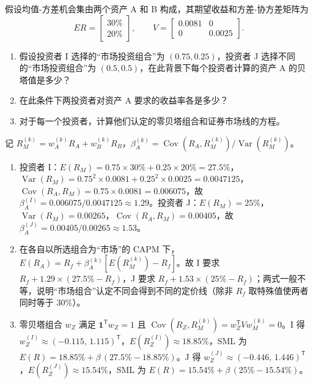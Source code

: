 \begin{problem}
 假设均值-方差机会集由两个资产 A 和 B 构成，其期望收益和方差-协方差矩阵为
\[
    ER=\begin{bmatrix}30\%\\20\%\end{bmatrix},\qquad
    V=\begin{bmatrix}0.0081&0\\0&0.0025\end{bmatrix}.
\]
\begin{enumerate}[label=(\alph*)]
    \item 假设投资者 I 选择的“市场投资组合”为 $(0.75,0.25)$，投资者 J 选择不同的“市场投资组合”为 $(0.5,0.5)$，在此背景下每个投资者计算的资产 A 的贝塔值是多少？
    \item 在此条件下两投资者对资产 A 要求的收益率各是多少？
    \item 对于每一个投资者，计算他们认定的零贝塔组合和证券市场线的方程。
\end{enumerate}
\end{problem}
\begin{solution}
记 $R_M^{(k)}=w_A^{(k)}R_A+w_B^{(k)}R_B$，$\beta_A^{(k)}=\operatorname{Cov}(R_A,R_M^{(k)})/\operatorname{Var}(R_M^{(k)})$。
\begin{enumerate}[label=(\alph*)]
\item 投资者 I：$E(R_M)=0.75\times30\%+0.25\times20\%=27.5\%$，$\operatorname{Var}(R_M)=0.75^2\times0.0081+0.25^2\times0.0025=0.0047125$，$\operatorname{Cov}(R_A,R_M)=0.75\times0.0081=0.006075$，故 $\beta_A^{(I)}=0.006075/0.0047125\approx1.29$。投资者 J：$E(R_M)=25\%$，$\operatorname{Var}(R_M)=0.00265$，$\operatorname{Cov}(R_A,R_M)=0.00405$，故 $\beta_A^{(J)}=0.00405/0.00265\approx1.53$。
\item 在各自以所选组合为“市场”的 CAPM 下，$E(R_A)=R_f+\beta_A^{(k)}[E(R_M^{(k)})-R_f]$。故 I 要求 $R_f+1.29\times(27.5\%-R_f)$，J 要求 $R_f+1.53\times(25\%-R_f)$；两式一般不等，说明“市场组合”认定不同会得到不同的定价线（除非 $R_f$ 取特殊值使两者同时等于 $30\%$）。
\item 零贝塔组合 $w_Z$ 满足 $\mathbf1^{\mathsf T}w_Z=1$ 且 $\operatorname{Cov}(R_Z,R_M^{(k)})=w_Z^{\mathsf T}Vw_M^{(k)}=0$。I 得 $w_Z^{(I)}\approx(-0.115,\,1.115)^{\mathsf T}$，$E(R_Z^{(I)})\approx18.85\%$，SML 为 $E(R)=18.85\%+\beta\,(27.5\%-18.85\%)$。J 得 $w_Z^{(J)}\approx(-0.446,\,1.446)^{\mathsf T}$，$E(R_Z^{(J)})\approx15.54\%$，SML 为 $E(R)=15.54\%+\beta\,(25\%-15.54\%)$。
\end{enumerate}
\end{solution}
